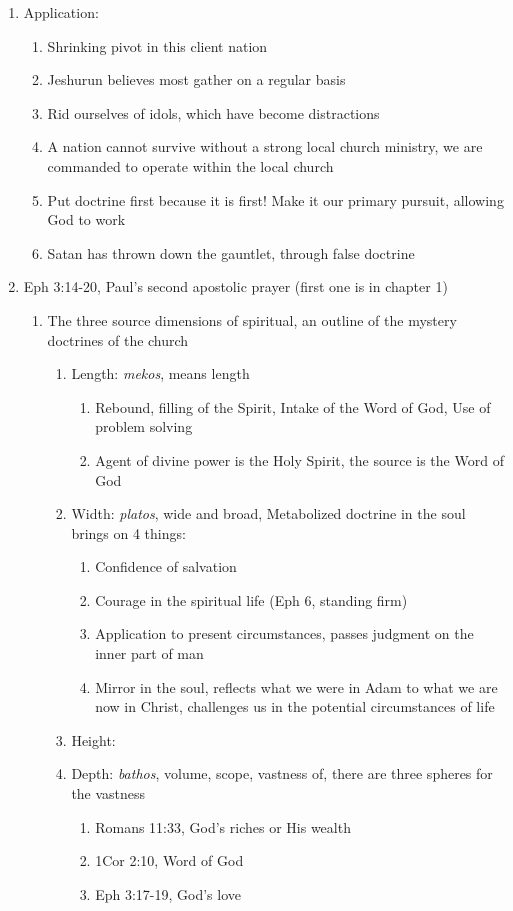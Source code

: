 \documentclass[11pt]{article}
\begin{document}
\begin{enumerate}
	\item Application:
	\begin{enumerate}
		\item Shrinking pivot in this client nation
		\item Jeshurun believes most gather on a regular basis
		\item Rid ourselves of idols, which have become distractions
		\item A nation cannot survive without a strong local church ministry, we are commanded to operate within the local church
		\item Put doctrine first because it is first! Make it our primary pursuit, allowing God to work
		\item Satan has thrown down the gauntlet, through false doctrine
	\end{enumerate}

	\item Eph 3:14-20, Paul's second apostolic prayer (first one is in chapter 1)
	\begin{enumerate}
		\item The three source dimensions of spiritual, an outline of the mystery doctrines of the church
		\begin{enumerate}
			\item Length: \emph{mekos}, means length
			\begin{enumerate}
				\item Rebound, filling of the Spirit, Intake of the Word of God, Use of problem solving
				\item Agent of divine power is the Holy Spirit, the source is the Word of God
			\end{enumerate}
			\item Width: \emph{platos}, wide and broad, Metabolized doctrine in the soul brings on 4 things:
			\begin{enumerate}
				\item Confidence of salvation
				\item Courage in the spiritual life (Eph 6, standing firm)
				\item Application to present circumstances, passes judgment on the inner part of man
				\item Mirror in the soul, reflects what we were in Adam to what we are now in Christ, challenges us in the potential circumstances of life
			\end{enumerate}
			\item Height:
			\item Depth: \emph{bathos}, volume, scope, vastness of, there are three spheres for the vastness
			\begin{enumerate}
				\item Romans 11:33, God's riches or His wealth
				\item 1Cor 2:10, Word of God
				\item Eph 3:17-19, God's love
			\end{enumerate}
		\end{enumerate}
	\end{enumerate}
\end{enumerate}
\end{document}
